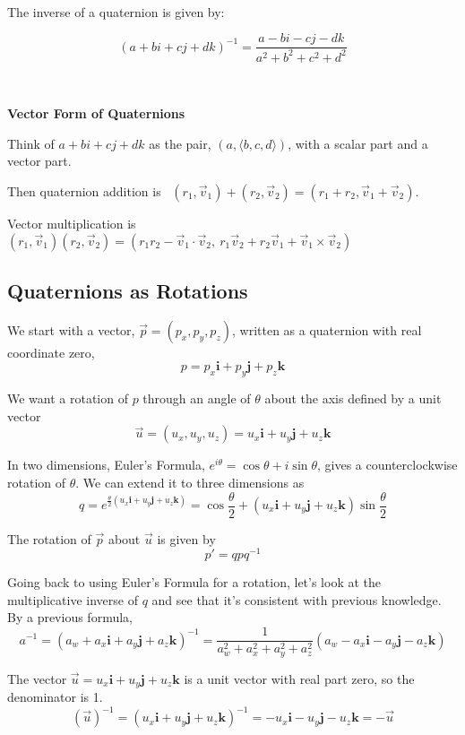 \documentclass[12pt]{article}
\begin{document}
\begin{spacing}{1.2}
\begin{tikzpicture}[x=10mm, y=10mm]
\end{tikzpicture}
\hfil

\

The inverse of a quaternion is given by:

$$ (a + bi + cj + dk)^{-1} = \frac{a - bi - cj - dk}{a^2 + b^2 + c^2 + d^2}$$

\

{\bf Vector Form of Quaternions}

Think of $a + bi + cj + dk$ as the pair, $(a, \langle b,c,d \rangle )$, with a scalar part and a vector part.  

Then quaternion addition is \ $(r_1, \vec{v}_1) + (r_2, \vec{v}_2) = (r_1 + r_2, \vec{v}_1 + \vec{v}_2)$.

Vector multiplication is $(r_1,\vec{v}_1) (r_2,\vec{v}_2) = (r_1r_2 - \vec{v}_1 \cdot \vec{v}_2, \ r_1\vec{v}_2 + r_2 \vec{v}_1 + \vec{v}_1 \times \vec{v}_2)$


\subsection{Quaternions as Rotations}

We start with a vector, $\vec{p} = (p_x, p_y, p_z)$, written as a quaternion with real coordinate zero, 
$$p = p_x \mathbf{i} + p_y \mathbf{j} + p_z \mathbf{k}$$

We want a rotation of $p$ through an angle of $\theta$ about the axis defined by a unit vector $$\vec{u} =  ( u_x, u_y, u_z ) = u_x \mathbf{i} + u_y \mathbf{j} + u_z \mathbf{k}$$ 

In two dimensions, Euler's Formula,  $e^{i\theta} = \cos \theta + i \sin \theta$, gives a counterclockwise rotation of $\theta$.  We can extend it to three dimensions as
$$q = e^{ 
	\frac{\theta}{2}
	( u_x \mathbf{i} + u_y \mathbf{j} + u_z \mathbf{k} )
	}
=
	\cos \frac{\theta}{2} + ( u_x \mathbf{i} + u_y \mathbf{j} + u_z \mathbf{k} ) \sin \frac{\theta}{2}
$$

The rotation of $\vec{p}$ about $\vec{u}$ is given by 
$$p' = q p q^{-1}$$

Going back to using Euler's Formula for a rotation, let's look at the multiplicative inverse of $q$ and see that it's consistent with previous knowledge.  By a previous formula, 
$$a^{-1} = (a_w + a_x \mathbf{i} + a_y \mathbf{j} + a_z \mathbf{k})^{-1} = 
\frac{1}{a_w^2 + a_x^2 + a_y^2 + a_z^2} (a_w - a_x \mathbf{i} - a_y \mathbf{j} - a_z \mathbf{k} )$$

The vector $\vec{u} = u_x \mathbf{i} + u_y \mathbf{j} + u_z \mathbf{k}$ is a unit vector with real part zero, so the denominator is 1.  
$$(\vec{u})^{-1} = (u_x \mathbf{i} + u_y \mathbf{j} + u_z \mathbf{k})^{-1} = -u_x \mathbf{i} - u_y \mathbf{j} - u_z \mathbf{k} = -\vec{u}$$


\end{spacing}
\end{document}
